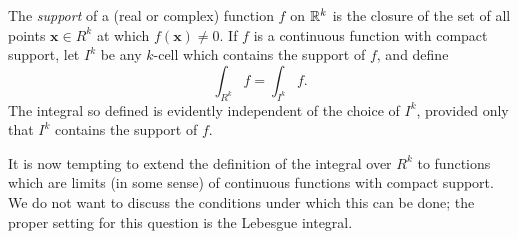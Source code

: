 \begin{mydef}
    \label{mydef:10.3}
    The \emph{support} of a (real or complex) function $f$ on ${\protect\mathbb R}^k$ is the
    closure of the set of all points $\mathbf{x} \in R^k$ 
    at which $f(\mathbf{x}) \neq 0$. 
    If $f$ is a continuous function with compact support, 
    let $I^k$ be any $k$-cell which contains the support of $f$, 
    and define
    \begin{equation}
        \label{eq:10.3}
        \int_{R^k} f =
        \int_{I^k} f .
    \end{equation}
    The integral so defined is evidently independent of the choice of $I^k$, provided only that $I^k$ contains the support of $f$.

\end{mydef}


It is now tempting to extend the definition of the integral over $R^k$ to
functions which are limits (in some sense) of continuous functions with compact support. 
We do not want to discuss the conditions under which this can be done; 
the proper setting for this question is the Lebesgue integral. 

